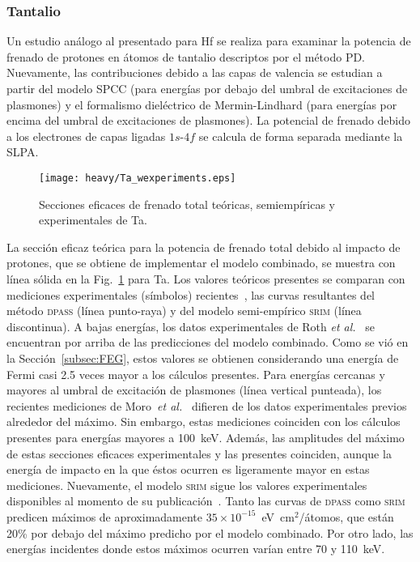 \subsubsection{Tantalio}
\label{subsec:tantalio}

Un estudio análogo al presentado para Hf se realiza para examinar la 
potencia de frenado de protones en átomos de tantalio descriptos por el 
método PD. Nuevamente, las contribuciones debido a las capas de valencia 
se estudian a partir del modelo SPCC (para energías por debajo del 
umbral de excitaciones de plasmones) y el formalismo dieléctrico de 
Mermin-Lindhard (para energías por encima del umbral de excitaciones de 
plasmones). La potencial de frenado debido a los electrones de capas 
ligadas $1s$-$4f$ se calcula de forma separada mediante la SLPA.

\begin{figure}[t]
\centering
\texttt{[image: heavy/Ta\_wexperiments.eps]}
\caption[Secciones eficaces teóricas, semiempíricas y experimentales de 
Ta.]
{Secciones eficaces de frenado total teóricas, semiempíricas y
experimentales de Ta.}
\label{fig:Ta_SP}
\end{figure}

La sección eficaz teórica para la potencia de frenado total debido al 
impacto de protones, que se obtiene de implementar el modelo combinado, 
se muestra con línea sólida en la Fig.~\ref{fig:Ta_SP} para Ta. Los 
valores teóricos presentes se comparan con mediciones experimentales 
(símbolos) recientes~\cite{Moro:20,Roth:17,iaea,Shiomi:96,Shiomi:94,
Bichsel:92,Ogino:88,Sirotinin:84,Krist:83}, las curvas resultantes del 
método \textsc{dpass} (línea punto-raya) y del modelo semi-empírico 
\textsc{srim} (línea discontinua). A bajas energías, los datos 
experimentales de Roth \textit{et al.}~\cite{Roth:17} se encuentran por 
arriba de las predicciones del modelo combinado. Como se vió en la 
Sección~\ref{subsec:FEG}, estos valores se obtienen considerando una 
energía de Fermi casi 2.5 veces mayor a los cálculos presentes. Para 
energías cercanas y mayores al umbral de excitación de plasmones (línea 
vertical punteada), los recientes mediciones de 
Moro~\textit{et al.}~\cite{Moro:20} difieren de los datos experimentales 
previos alrededor del máximo. Sin embargo, estas mediciones coinciden 
con los cálculos presentes para energías mayores a 100~keV. Además, las 
amplitudes del máximo de estas secciones 
eficaces experimentales y las presentes coinciden, aunque la energía de 
impacto en la que éstos ocurren es ligeramente mayor en estas mediciones. 
Nuevamente, el modelo \textsc{srim} sigue los valores experimentales 
disponibles al momento de su publicación~\cite{iaea}. Tanto las curvas 
de \textsc{dpass} como \textsc{srim} predicen máximos de aproximadamente 
$35\times 10^{-15}$~eV~cm$^2$/átomos, que están 20\% por debajo del 
máximo predicho por el modelo combinado. Por otro lado, las energías 
incidentes donde estos máximos ocurren varían entre 70 y 110~keV. 


